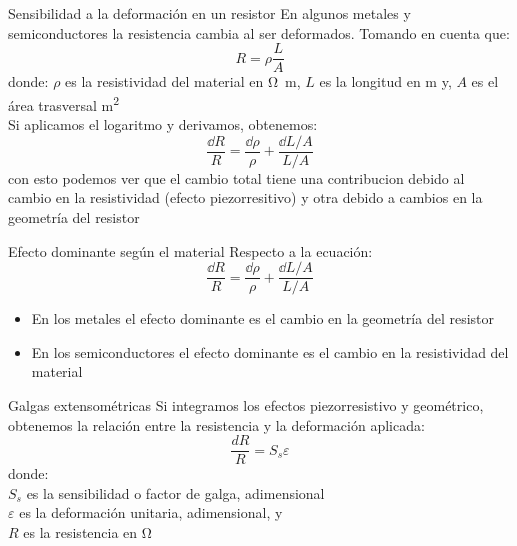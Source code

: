 \documentclass[aspectratio=169]{beamer}
\begin{document}
\begin{frame}{Sensibilidad a la deformación en un resistor}
    En algunos metales y semiconductores la resistencia cambia al ser deformados. Tomando en cuenta que: 
    \begin{equation*}
        R = \rho \dfrac{L}{A}
    \end{equation*}   
    donde: $\rho$ es la resistividad del material en \si{\ohm\meter}, $L$ es la longitud en \si{\meter} y, $A$ es el área trasversal \si{\meter\squared}\\[8pt]
    Si aplicamos el logaritmo y derivamos, obtenemos:
    \begin{equation*}
        \dfrac{\dd R}{R} = \dfrac{\dd \rho}{\rho} + \dfrac{\dd L/A}{L/A}
    \end{equation*} 
    con esto podemos ver que el cambio total tiene una contribucion debido al cambio en la resistividad (efecto piezorresitivo) y otra debido a cambios en la geometría del resistor
\end{frame}

\begin{frame}{Efecto dominante según el material}
    Respecto a la ecuación:
    \begin{equation*}
        \dfrac{\dd R}{R} = \dfrac{\dd \rho}{\rho} + \dfrac{\dd L/A}{L/A}
    \end{equation*} 
    \begin{itemize}
        \item En los metales el efecto dominante es el cambio en la geometría del resistor
        \item En los semiconductores el efecto dominante es el cambio en la resistividad del material
    \end{itemize}
\end{frame}

\begin{frame}[t]{Galgas extensométricas}
    Si integramos los efectos piezorresistivo y geométrico, obtenemos la relación entre la resistencia y la deformación aplicada:
    \begin{equation*}
        \dfrac{dR}{R} = S_s \varepsilon
    \end{equation*}
    donde:\\
    $S_s$ es la sensibilidad o factor de galga, adimensional\\
    $\varepsilon$ es la deformación unitaria, adimensional, y\\
    $R$ es la resistencia en $\si{\ohm}$
\end{frame}
\end{document}
